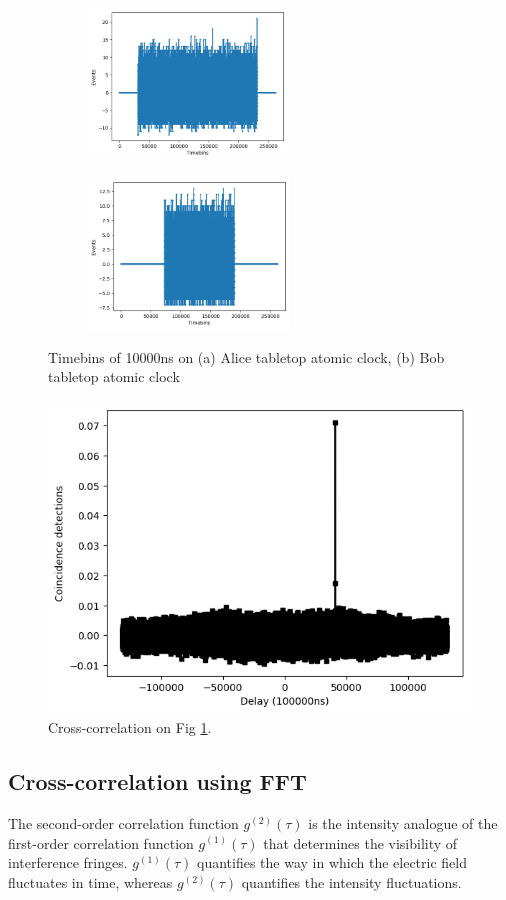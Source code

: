 \begin{figure}[ht!]
	\centering
	\begin{subfigure}[t]{0.49\linewidth}
		\centering
		\includegraphics[height=4cm]{assets/alice_bin.png}
		\subcaption{}
	\end{subfigure}
	\begin{subfigure}[t]{0.49\textwidth}
		\centering
		\includegraphics[height=4cm]{assets/bob_bin.png}
		\subcaption{}
	\end{subfigure}
	\caption{Timebins of 10000ns on (a) Alice tabletop atomic clock, (b) Bob tabletop atomic clock}
	\label{fig:timebins}
\end{figure}

\begin{figure}[ht!]
	\includegraphics[width=0.97\linewidth]{assets/cc_bin}
	\caption{Cross-correlation on Fig \ref{fig:timebins}.}
	\label{fig:cc_bin}
\end{figure}

\subsection{Cross-correlation using FFT}

The second-order correlation function $g^{(2)}(\tau)$ is the intensity analogue of the first-order correlation function $g^{(1)}(\tau)$ that determines the visibility of interference fringes. $g^{(1)}(\tau)$ quantifies the way in which the electric field fluctuates in time, whereas $g^{(2)}(\tau)$ quantifies the intensity fluctuations.